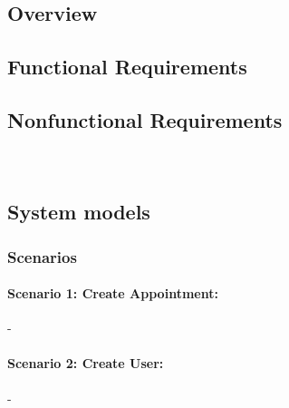 \documentclass{article}
\begin{document}
	\subsection{Overview}
	\subsection{Functional Requirements}
	\subsection{Nonfunctional Requirements}				%
		\subsubsection*{}
		\\
	\subsection{System models}							%
		\subsubsection{Scenarios}
			\paragraph{Scenario 1: Create Appointment:}
			 -\\

			\paragraph{Scenario 2: Create User:}
			 -\\
			
\end{document}

